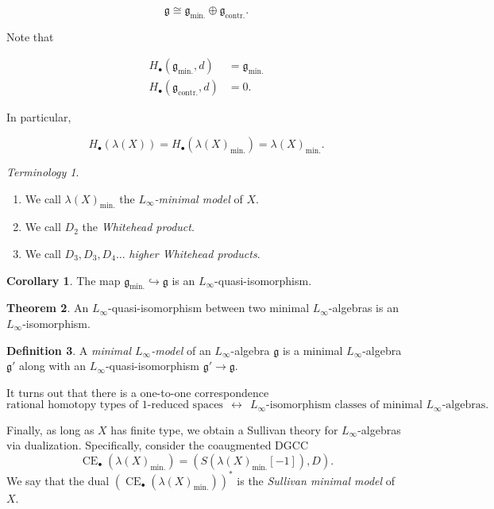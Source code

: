 \documentclass[10pt,letterpaper,cm]{nupset}
\theoremstyle{definition}
\newtheorem{defn}{Definition}[subsection]
\theoremstyle{theorem}
\newtheorem{theorem}[defn]{Theorem}
\newtheorem{corollary}[defn]{Corollary}
\theoremstyle{remark}
\newtheorem*{term}{Terminology}
\newcommand{\1}{\mathbb{1}}
\newcommand{\0}{\vec 0}
\DeclareMathOperator{\ce}{CE}
\newcommand{\be}{\begin{enumerate}}
\newcommand{\ee}{\end{enumerate}}
\begin{document}
\[
\mathfrak{g} \cong \mathfrak{g}_{\text{min.}} \oplus \mathfrak{g}_{\text{contr.}}.
\]


Note that 

\begin{align*}
H_{\bullet}(\mathfrak{g}_{\text{min.}}, d)  & = \mathfrak{g}_{\text{min.}}
\\ H_{\bullet}(\mathfrak{g}_{\text{contr.}}, d) & = 0 
.\end{align*}

In particular,

\[
H_{\bullet}(\lambda(X)) = H_{\bullet}(\lambda(X)_{\text{min.}}) = \lambda(X)_{\text{min.}}
.\] 

\begin{term} $ $
\be
\item We call $\lambda(X)_{\text{min.}}$ the \textit{$L_{\infty}$-minimal model} of $X$.
\item We call $D_2$ the \textit{Whitehead product}. 
\item We call $D_3, D_3, D_4 \ldots $ \textit{higher Whitehead products}.
\ee
\end{term}

\begin{corollary}
The map $\mathfrak{g}_{\text{min.}} \hookrightarrow \mathfrak{g}$ is an $L_{\infty}$-quasi-isomorphism.
\end{corollary}

\begin{theorem}
An $L_{\infty}$-quasi-isomorphism between two minimal $L_{\infty}$-algebras is an $L_{\infty}$-isomorphism. 
\end{theorem}

\begin{defn}
A \textit{minimal $L_{\infty}$-model} of an $L_{\infty}$-algebra $\mathfrak{g}$ is a minimal $L_{\infty}$-algebra $\mathfrak{g}'$ along with an $L_{\infty}$-quasi-isomorphism $\mathfrak{g}' \to  \mathfrak{g}$.
\end{defn}

It turns out that there is a one-to-one correspondence 
\[
\text{rational homotopy types of $1$-reduced spaces} \ \  \leftrightarrow \ \ \text{$L_{\infty}$-isomorphism classes of minimal $L_{\infty}$-algebras}
.\]

\medskip

Finally, as long as $X$ has finite type, we obtain  a Sullivan theory for $L_{\infty}$-algebras via dualization. Specifically, consider the coaugmented DGCC
\[
\ce_{\bullet}(\lambda(X)_{\text{min.}}) = \left(S(\lambda(X)_{\text{min.}}\left[{-1}\right]), D\right)
.\]
We say that the dual $\left(\ce_{\bullet}(\lambda(X)_{\text{min.}}) \right)^{\ast}$ is the \textit{Sullivan minimal model} of $X$.
\end{document}
